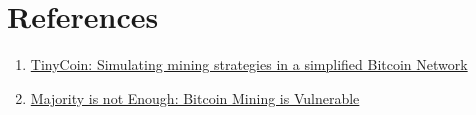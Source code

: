 \documentclass{article}
\begin{document}
\section{References} 
\begin{enumerate}
\item \href{https://elearning.di.unipi.it/pluginfile.php/14179/mod_assign/intro/SelfishMining.pdf}{TinyCoin: Simulating mining strategies in a simplified Bitcoin Network}
\item \href{https://elearning.di.unipi.it/pluginfile.php/14179/mod_assign/intro/MajorityisNotEnough.pdf}{Majority is not Enough: Bitcoin Mining is Vulnerable}
\end{enumerate}
\end{document}
